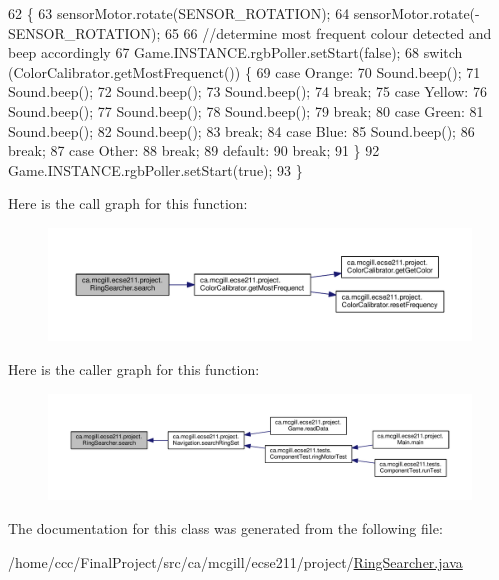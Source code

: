 \begin{DoxyCode}
62                         \{
63     sensorMotor.rotate(SENSOR\_ROTATION);
64     sensorMotor.rotate(-SENSOR\_ROTATION);
65 
66     \textcolor{comment}{//determine most frequent colour detected and beep accordingly}
67     Game.INSTANCE.rgbPoller.setStart(\textcolor{keyword}{false});
68     \textcolor{keywordflow}{switch} (ColorCalibrator.getMostFrequenct()) \{
69       \textcolor{keywordflow}{case} Orange:
70         Sound.beep();
71         Sound.beep();
72         Sound.beep();
73         Sound.beep();
74         \textcolor{keywordflow}{break};
75       \textcolor{keywordflow}{case} Yellow:
76         Sound.beep();
77         Sound.beep();
78         Sound.beep();
79         \textcolor{keywordflow}{break};
80       \textcolor{keywordflow}{case} Green:
81         Sound.beep();
82         Sound.beep();
83         \textcolor{keywordflow}{break};
84       \textcolor{keywordflow}{case} Blue:
85         Sound.beep();
86         \textcolor{keywordflow}{break};
87       \textcolor{keywordflow}{case} Other:
88         \textcolor{keywordflow}{break};
89       \textcolor{keywordflow}{default}:
90         \textcolor{keywordflow}{break};
91     \}
92     Game.INSTANCE.rgbPoller.setStart(\textcolor{keyword}{true});
93   \}  
\end{DoxyCode}
Here is the call graph for this function\+:
\nopagebreak
\begin{figure}[H]
\begin{center}
\leavevmode
\includegraphics[width=350pt]{classca_1_1mcgill_1_1ecse211_1_1project_1_1_ring_searcher_a7ff5756046a0ce992ed8cb8954139c3b_cgraph}
\end{center}
\end{figure}
Here is the caller graph for this function\+:
\nopagebreak
\begin{figure}[H]
\begin{center}
\leavevmode
\includegraphics[width=350pt]{classca_1_1mcgill_1_1ecse211_1_1project_1_1_ring_searcher_a7ff5756046a0ce992ed8cb8954139c3b_icgraph}
\end{center}
\end{figure}


The documentation for this class was generated from the following file\+:\begin{DoxyCompactItemize}
\item 
/home/ccc/\+Final\+Project/src/ca/mcgill/ecse211/project/\hyperlink{_ring_searcher_8java}{Ring\+Searcher.\+java}\end{DoxyCompactItemize}

